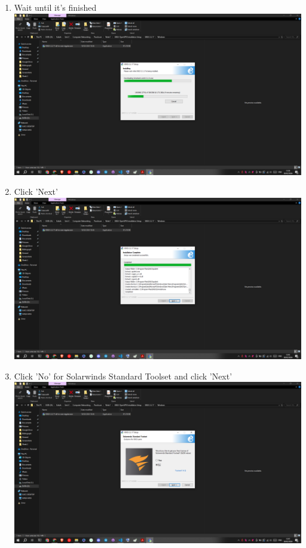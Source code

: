 \documentclass[12pt,titlepage]{article}
\begin{document}
\begin{enumerate}
    \item Wait until it's finished \\ \includegraphics[width=.9\textwidth]{images/figures/Screenshot (438).png}
    \newpage
    \item Click 'Next' \\ \includegraphics[width=.9\textwidth]{images/figures/Screenshot (439).png}
    \item Click 'No' for Solarwinds Standard Toolset and click 'Next' \\ \includegraphics[width=.9\textwidth]{images/figures/Screenshot (440).png}
    \newpage

\end{enumerate}
\end{document}
